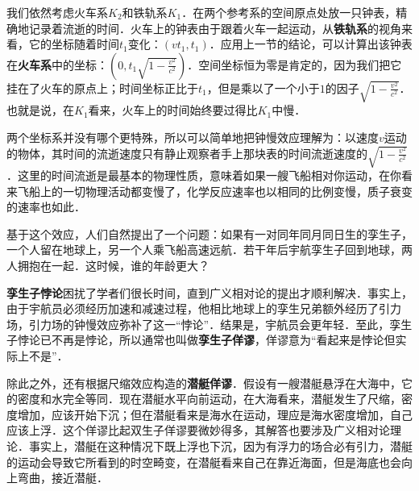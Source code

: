 我们依然考虑火车系$K_2$和铁轨系$K_1$．在两个参考系的空间原点处放一只钟表，精确地记录着流逝的时间．火车上的钟表由于跟着火车一起运动，从\textbf{铁轨系}的视角来看，它的坐标随着时间$t_1$变化：$(vt_1, t_1)$．应用上一节的结论，可以计算出该钟表在\textbf{火车系}中的坐标：$(0, t_1\sqrt{1-\frac{v^2}{c^2}})$．空间坐标恒为零是肯定的，因为我们把它挂在了火车的原点上；时间坐标正比于$t_1$，但是乘以了一个小于$1$的因子$\sqrt{1-\frac{v^2}{c^2}}$．也就是说，在$K_1$看来，火车上的时间始终要过得比$K_1$中慢．

两个坐标系并没有哪个更特殊，所以可以简单地把钟慢效应理解为：以速度$v$运动的物体，其时间的流逝速度只有静止观察者手上那块表的时间流逝速度的$\sqrt{1-\frac{v^2}{c^2}}$．这里的时间流逝是最基本的物理性质，意味着如果一艘飞船相对你运动，在你看来飞船上的一切物理活动都变慢了，化学反应速率也以相同的比例变慢，质子衰变的速率也如此．

基于这个效应，人们自然提出了一个问题：如果有一对同年同月同日生的孪生子，一个人留在地球上，另一个人乘飞船高速远航．若干年后宇航孪生子回到地球，两人拥抱在一起．这时候，谁的年龄更大？

\textbf{孪生子悖论}困扰了学者们很长时间，直到广义相对论的提出才顺利解决．事实上，由于宇航员必须经历加速和减速过程，他相比地球上的孪生兄弟额外经历了引力场，引力场的钟慢效应弥补了这一“悖论”．结果是，宇航员会更年轻．至此，孪生子悖论已不再是悖论，所以通常也叫做\textbf{孪生子佯谬}，佯谬意为“看起来是悖论但实际上不是”．

除此之外，还有根据尺缩效应构造的\textbf{潜艇佯谬}．假设有一艘潜艇悬浮在大海中，它的密度和水完全等同．现在潜艇水平向前运动，在大海看来，潜艇发生了尺缩，密度增加，应该开始下沉；但在潜艇看来是海水在运动，理应是海水密度增加，自己应该上浮．这个佯谬比起双生子佯谬要微妙得多，其解答也要涉及广义相对论理论．事实上，潜艇在这种情况下既上浮也下沉，因为有浮力的场合必有引力，潜艇的运动会导致它所看到的时空畸变，在潜艇看来自己在靠近海面，但是海底也会向上弯曲，接近潜艇．
